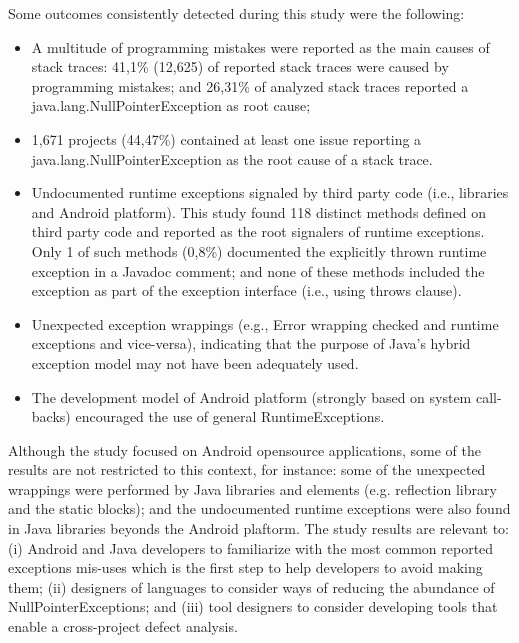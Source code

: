 \documentclass[conference]{IEEEtran}
\begin{document}

Some outcomes consistently detected during this study were the following:

\begin{itemize}

   \item  A multitude of programming mistakes were reported as the main causes of stack traces:
  41,1\%  (12,625)  of reported stack traces were caused by programming mistakes; and 26,31\% of analyzed stack traces reported a java.lang.NullPointerException as root cause;

   \item 1,671 projects (44,47\%) contained at least one issue reporting a java.lang.NullPointerException as the root cause of a stack trace.

   \item Undocumented runtime exceptions signaled by third party
    code (i.e., libraries and Android platform). This study found 118 distinct methods defined on third party code and  reported as the root signalers of runtime exceptions. Only 1 of such methods (0,8\%) documented the explicitly thrown runtime exception in a Javadoc comment; and none of these methods included the exception as part of the exception interface (i.e., using throws clause).

   \item  Unexpected exception wrappings (e.g., Error wrapping checked and runtime
    exceptions and vice-versa), indicating that the purpose of Java's hybrid exception model may not have been adequately used.

   \item  The development model of Android platform (strongly based on system call-backs) encouraged 
     the use of general RuntimeExceptions.


\end{itemize}

Although the study focused on Android opensource applications, some of the results are not restricted to this context, 
for instance: some of the unexpected wrappings were performed by Java libraries and elements (e.g. reflection library and 
the static blocks); and the undocumented runtime exceptions were also found in Java libraries beyonds the Android plaftorm.
The study results are relevant to: (i) Android and Java developers to familiarize with the most common reported exceptions 
mis-uses which is the first step to help developers to avoid making them; (ii) designers of languages to consider ways of reducing the abundance of NullPointerExceptions; and (iii) tool designers to consider developing tools that enable a cross-project defect analysis.
\end{document}
